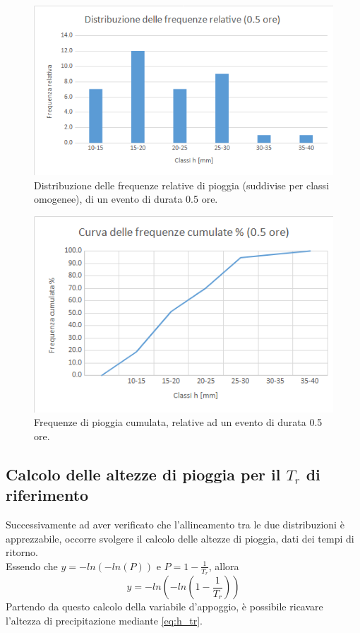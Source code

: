 \begin{figure}[H]\centering
    \includegraphics[scale=.6]{immagini/freq_piogg_rel_05ore.png}
    \caption{Distribuzione delle frequenze relative di pioggia (suddivise per classi omogenee), di un evento di durata 0.5 ore.}
  \label{freq_rel_piogg_05ore}
\end{figure}

\begin{figure}[H]\centering
    \includegraphics[scale=.6]{immagini/freq_piogg_cum_05ore.png}
    \caption{Frequenze di pioggia cumulata, relative ad un evento di durata 0.5 ore.}
  \label{freq_cum_piogg_05ore}
\end{figure}

\subsection{Calcolo delle altezze di pioggia per il $T_r$ di riferimento}
Successivamente ad aver verificato che l'allineamento tra le due distribuzioni è apprezzabile, occorre svolgere il calcolo delle altezze di pioggia, dati dei tempi di ritorno.\\
Essendo che $y = -ln(-ln(P))$ e $P = 1-\frac{1}{T_r}$, allora 
\begin{equation}
y = -ln\left(-ln\left(1-\frac{1}{T_r}\right)\right)
\end{equation}
Partendo da questo calcolo della variabile d'appoggio, è possibile ricavare l'altezza di precipitazione mediante \eqref{eq:h_tr}.

